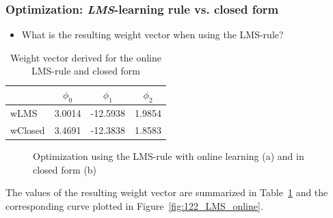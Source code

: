 \documentclass[a4]{article}
\begin{document}
\subsubsection{Optimization: \emph{LMS}-learning rule vs. closed form}
%
%
\begin{itemize}
	\item What is the resulting weight vector when using the LMS-rule?
\end{itemize}
\begin{table} [tbp!]
	\caption{Weight vector derived for the online LMS-rule and closed form}
	\centering
	\label{table:wLMS}
	\begin{tabular}{l c c c}
		\toprule
		& $\phi_0$ & $\phi_1$ & $\phi_2$ \\ 
		\midrule
		wLMS & 3.0014  & -12.5938  &  1.9854 \\
		wClosed &  3.4691  & -12.3838  &  1.8583  \\
		\bottomrule
	\end{tabular}
\end{table}
\begin{figure}[!h]
	\centering
	\caption{Optimization using the LMS-rule with online learning (a) and in closed form (b)}
	\label{fig:122_LMS}
\end{figure}
The values of the resulting weight vector are summarized in Table~\ref{table:wLMS} and the corresponding curve plotted in Figure~\ref{fig:122_LMS_online}.
\end{document}
